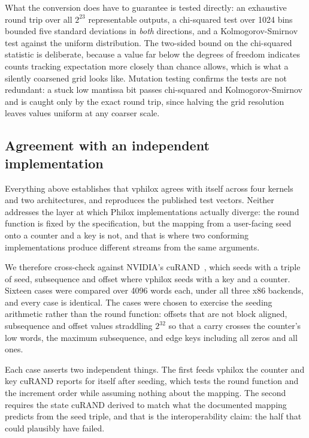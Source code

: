 \documentclass[acmsmall,screen,review]{acmart}
\theoremstyle{acmdefinition}
\begin{document}
What the conversion does have to guarantee is tested directly: an exhaustive
round trip over all $2^{23}$ representable outputs, a chi-squared test over 1024
bins bounded five standard deviations in \emph{both} directions, and a
Kolmogorov-Smirnov test against the uniform distribution. The two-sided bound on
the chi-squared statistic is deliberate, because a value far below the degrees
of freedom indicates counts tracking expectation more closely than chance
allows, which is what a silently coarsened grid looks like. Mutation testing
confirms the tests are not redundant: a stuck low mantissa bit passes
chi-squared and Kolmogorov-Smirnov and is caught only by the exact round trip,
since halving the grid resolution leaves values uniform at any coarser scale.

\subsection{Agreement with an independent implementation}\label{sec:curand}

Everything above establishes that vphilox agrees with itself across four kernels
and two architectures, and reproduces the published test vectors. Neither
addresses the layer at which Philox implementations actually diverge: the round
function is fixed by the specification, but the mapping from a user-facing seed
onto a counter and a key is not, and that is where two conforming
implementations produce different streams from the same arguments.

We therefore cross-check against NVIDIA's cuRAND~\cite{curand}, which seeds with
a triple of seed, subsequence and offset where vphilox seeds with a key and a
counter. Sixteen cases were compared over 4096 words each, under all three x86
backends, and every case is identical. The cases were chosen to exercise the
seeding arithmetic rather than the round function: offsets that are not block
aligned, subsequence and offset values straddling $2^{32}$ so that a carry
crosses the counter's low words, the maximum subsequence, and edge keys
including all zeros and all ones.

Each case asserts two independent things. The first feeds vphilox the counter
and key cuRAND reports for itself after seeding, which tests the round function
and the increment order while assuming nothing about the mapping. The second
requires the state cuRAND derived to match what the documented mapping predicts
from the seed triple, and that is the interoperability claim: the half that
could plausibly have failed.
\end{document}
